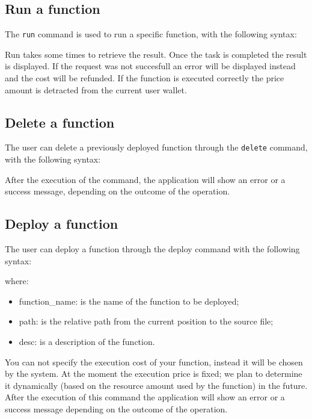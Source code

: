 \subsection{Run a function}
The \texttt{run} command is used to run a specific function, with the following syntax: \\
\begin{center}
\end{center}
Run takes some times to retrieve the result. Once the task is completed the result is displayed. If the request was not succesfull an error will be displayed instead and the cost will be refunded. If the function is executed correctly the price amount is detracted from the current user wallet.

\subsection{Delete a function}
The user can delete a previously deployed function through the \texttt{delete} command, with the following syntax:
\begin{center}
\end{center}
After the execution of the command, the application will show an error or a success message, depending on the outcome of the operation.

\subsection{Deploy a function}
The user can deploy a function through the deploy command with the following syntax:
\begin{center}
\end{center}
\noindent where:
\begin{itemize}
	\item function\_name: is the name of the function to be deployed;
	\item path: is the relative path from the current position to the source file;
	\item desc: is a description of the function.
\end{itemize}
You can not specify the execution cost of your function, instead it will be chosen by the system. At the moment the execution price is fixed; we plan to determine it dynamically (based on the resource amount used by the function) in the future. After the execution of this command  the application will show an error or a success message depending on the outcome of the operation.
